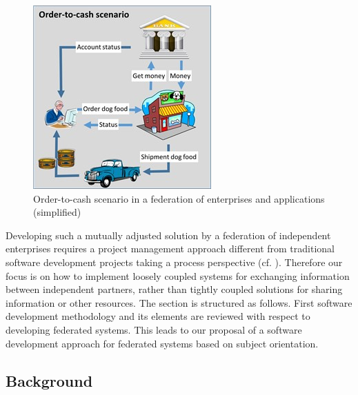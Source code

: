 \begin{figure}[htbp]
	\centering
	\includegraphics[width=0.6\linewidth] {Figures/Chapter5/Project/DogFoodShop.jpg}
	\caption[Order-to-cash scenario in a federation of enterprises and applications (simplified)]{Order-to-cash scenario in a federation of enterprises and applications (simplified)}
	\label{fig:DogFoodShop}
\end{figure}

Developing such a mutually adjusted solution by a federation of independent enterprises requires a project management approach different from traditional software development projects taking a process perspective (cf. \cite{book:ProjectHistory}). Therefore our focus is on how to implement loosely coupled systems for exchanging information between independent partners, rather than tightly coupled solutions for sharing information or other resources.
The section is structured as follows. First software development methodology and its elements are reviewed with respect to developing federated systems. This leads to our proposal of a software development approach for federated systems based on subject orientation. 
\\
\subsection{Background}

